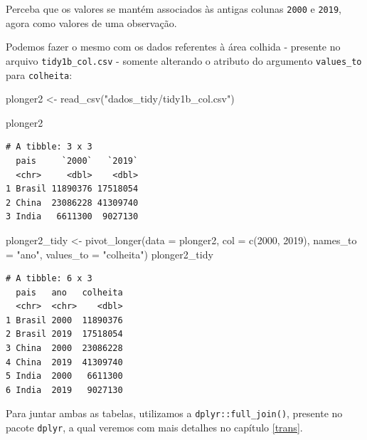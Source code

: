 \documentclass[
  brazilian,
]{book}
\newenvironment{Shaded}{\begin{snugshade}}{\end{snugshade}}
\newcommand{\AttributeTok}[1]{\textcolor[rgb]{0.77,0.63,0.00}{#1}}
\newcommand{\FunctionTok}[1]{\textcolor[rgb]{0.00,0.00,0.00}{#1}}
\newcommand{\NormalTok}[1]{#1}
\newcommand{\OtherTok}[1]{\textcolor[rgb]{0.56,0.35,0.01}{#1}}
\newcommand{\StringTok}[1]{\textcolor[rgb]{0.31,0.60,0.02}{#1}}
\begin{document}
Perceba que os valores se mantém associados às antigas colunas \texttt{2000} e \texttt{2019}, agora como valores de uma observação.

Podemos fazer o mesmo com os dados referentes à área colhida - presente no arquivo \texttt{tidy1b\_col.csv} - somente alterando o atributo do argumento \texttt{values\_to} para \texttt{colheita}:

\begin{Shaded}
\begin{Highlighting}[]
\NormalTok{plonger2 }\OtherTok{\textless{}{-}} \FunctionTok{read\_csv}\NormalTok{(}\StringTok{"dados\_tidy/tidy1b\_col.csv"}\NormalTok{)}

\NormalTok{plonger2}
\end{Highlighting}
\end{Shaded}

\begin{verbatim}
# A tibble: 3 x 3
  pais     `2000`   `2019`
  <chr>     <dbl>    <dbl>
1 Brasil 11890376 17518054
2 China  23086228 41309740
3 India   6611300  9027130
\end{verbatim}

\begin{Shaded}
\begin{Highlighting}[]
\NormalTok{plonger2\_tidy }\OtherTok{\textless{}{-}} \FunctionTok{pivot\_longer}\NormalTok{(}\AttributeTok{data =}\NormalTok{ plonger2,}
                              \AttributeTok{col =} \FunctionTok{c}\NormalTok{(}\StringTok{\textasciigrave{}}\AttributeTok{2000}\StringTok{\textasciigrave{}}\NormalTok{, }\StringTok{\textasciigrave{}}\AttributeTok{2019}\StringTok{\textasciigrave{}}\NormalTok{),}
                              \AttributeTok{names\_to =} \StringTok{"ano"}\NormalTok{, }
                              \AttributeTok{values\_to =} \StringTok{"colheita"}\NormalTok{)}
\NormalTok{plonger2\_tidy}
\end{Highlighting}
\end{Shaded}

\begin{verbatim}
# A tibble: 6 x 3
  pais   ano   colheita
  <chr>  <chr>    <dbl>
1 Brasil 2000  11890376
2 Brasil 2019  17518054
3 China  2000  23086228
4 China  2019  41309740
5 India  2000   6611300
6 India  2019   9027130
\end{verbatim}

Para juntar ambas as tabelas, utilizamos a \texttt{dplyr::full\_join()}, presente no pacote \texttt{dplyr}, a qual veremos com mais detalhes no capítulo \ref{trans}.
\end{document}
